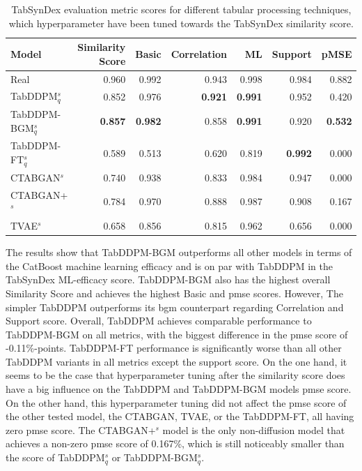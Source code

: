 \begin{table}[h]
	\centering
	\begin{tabular}{lrrrrrr}
		\toprule
		\textbf{Model}        & \textbf{Similarity Score} & \textbf{Basic} & \textbf{Correlation} & \textbf{ML}    & \textbf{Support} & \textbf{pMSE}  \\
		\midrule
		Real                  & 0.960                     & 0.992          & 0.943                & 0.998          & 0.984            & 0.882          \\
		TabDDPM$^{s}_{q}$     & 0.852                     & 0.976          & \textbf{0.921}       & \textbf{0.991} & 0.952            & 0.420          \\
		TabDDPM-BGM$^{s}_{q}$ & \textbf{0.857}            & \textbf{0.982} & 0.858                & \textbf{0.991} & 0.920            & \textbf{0.532} \\
		TabDDPM-FT$^{s}_{q}$  & 0.589                     & 0.513          & 0.620                & 0.819          & \textbf{0.992}   & 0.000          \\
		CTABGAN$^{s}$         & 0.740                     & 0.938          & 0.833                & 0.984          & 0.947            & 0.000          \\
		CTABGAN+$^{s}$        & 0.784                     & 0.970          & 0.888                & 0.987          & 0.908            & 0.167          \\
		TVAE$^{s}$            & 0.658                     & 0.856          & 0.815                & 0.962          & 0.656            & 0.000          \\
		\bottomrule
	\end{tabular}
	\caption[Experiment 2 TabSynDex]{TabSynDex evaluation metric scores for different tabular processing techniques, which hyperparameter have been tuned towards the TabSynDex similarity score.}
	\label{tab:exp2-sim}
\end{table}

The results show that TabDDPM-BGM outperforms all other models in terms of the CatBoost machine learning efficacy and is on par with TabDDPM in the TabSynDex ML-efficacy score.
TabDDPM-BGM also has the highest overall Similarity Score and achieves the highest Basic and \gls{pmse} scores.
However, The simpler TabDDPM outperforms its \gls{bgm} counterpart regarding Correlation and Support score.
Overall, TabDDPM achieves comparable performance to TabDDPM-BGM on all metrics, with the biggest difference in the \gls{pmse} score of -0.11\%-points.
TabDDPM-FT performance is significantly worse than all other TabDDPM variants in all metrics except the support score.
On the one hand, it seems to be the case that hyperparameter tuning after the similarity score does have a big influence on the TabDDPM and TabDDPM-BGM models \gls{pmse} score.
On the other hand, this hyperparameter tuning did not affect the \gls{pmse} score of the other tested model, the CTABGAN, TVAE, or the TabDDPM-FT, all having zero \gls{pmse} score.
The CTABGAN+$^{s}$ model is the only non-diffusion model that achieves a non-zero \gls{pmse} score of 0.167\%, which is still noticeably smaller than the score of TabDDPM$^{s}_{q}$ or TabDDPM-BGM$^{s}_{q}$.

